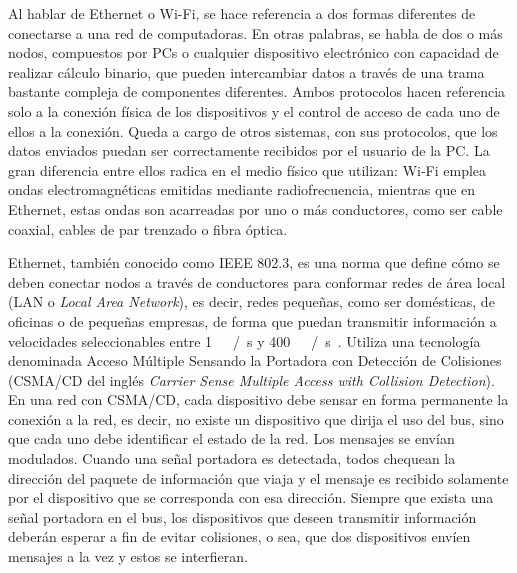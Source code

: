 Al hablar de Ethernet o Wi-Fi, se hace referencia a dos formas diferentes de conectarse a una red de computadoras. En otras palabras, se habla de dos o más nodos, compuestos por PCs o cualquier dispositivo electrónico con capacidad de realizar cálculo binario, que pueden intercambiar datos a través de una trama bastante compleja de componentes diferentes. Ambos protocolos hacen referencia solo a la conexión física de los dispositivos y el control de acceso de cada uno de ellos a la conexión. Queda a cargo de otros sistemas, con sus protocolos, que los datos enviados puedan ser correctamente recibidos por el usuario de la PC. La gran diferencia entre ellos radica en el medio físico que utilizan: Wi-Fi emplea ondas electromagnéticas emitidas mediante radiofrecuencia, mientras que en Ethernet, estas ondas son acarreadas por uno o más conductores, como ser cable coaxial, cables de par trenzado o fibra óptica.%

Ethernet, también conocido como IEEE 802.3, es una norma que define cómo se deben conectar nodos a través de conductores para conformar redes de área local (LAN o {\it Local Area Network}), es decir, redes pequeñas, como ser domésticas, de oficinas o de pequeñas empresas, de forma que puedan transmitir información a velocidades seleccionables entre \SI{1}{\mega\bit\slash\second} y \SI{400}{\giga\bit\slash\second}~\cite{Ethernet2018}. Utiliza una tecnología denominada Acceso Múltiple Sensando la Portadora con Detección de Colisiones (CSMA/CD del inglés {\it Carrier Sense Multiple Access with Collision Detection}). En una red con CSMA/CD, cada dispositivo debe sensar en forma permanente la conexión a la red, es decir, no existe un dispositivo que dirija el uso del bus, sino que cada uno debe identificar el estado de la red. Los mensajes se envían modulados. Cuando una señal portadora es detectada, todos chequean la dirección del paquete de información que viaja y el mensaje es recibido solamente por el dispositivo que se corresponda con esa dirección. Siempre que exista una señal portadora en el bus, los dispositivos que deseen transmitir información deberán esperar a fin de evitar colisiones, o sea, que dos dispositivos envíen mensajes a la vez y estos se interfieran.%

